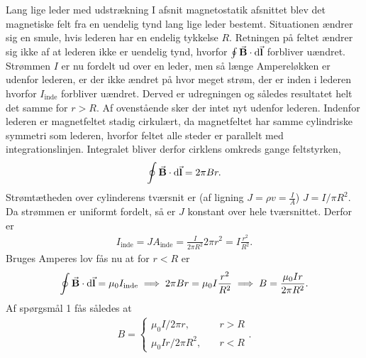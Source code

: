 \documentclass[crop=false, class=memoir]{standalone}
\begin{document}
\begin{opgave}{Lang lige leder med udstrækning}
    I afsnit magnetostatik afsnittet blev det magnetiske felt fra en uendelig tynd lang lige leder bestemt. Situationen ændrer sig en smule, hvis lederen har en endelig tykkelse $R$.
    \opg Retningen på feltet ændrer sig ikke af at lederen ikke er uendelig tynd, hvorfor $\oint \va B \cdot \dd \va l$ forbliver uændret. Strømmen $I$ er nu fordelt ud over en leder, men så længe Ampereløkken er udenfor lederen, er der ikke ændret på hvor meget strøm, der er inden i lederen hvorfor $I_\mathrm{inde}$ forbliver uændret. Derved er udregningen og således resultatet helt det samme for $r>R$.
    \opg Af ovenstående sker der intet nyt udenfor lederen. Indenfor lederen er magnetfeltet stadig cirkulært, da magnetfeltet har samme cylindriske symmetri som lederen, hvorfor feltet alle steder er parallelt med integrationslinjen. Integralet bliver derfor cirklens omkreds gange feltstyrken,
    \begin{align}
        \oint \va B \cdot \dd \va l = 2\pi B r.
    \end{align}
    \opg Strømtætheden over cylinderens tværsnit er (af ligning $J=\rho v=\frac{I}{A}$) $J = I/\pi R^2$. Da strømmen er uniformt fordelt, så er $J$ konstant over hele tværsnittet. Derfor er
    \begin{align}
        I_\mathrm{inde} = JA_\mathrm{inde}= \frac{I}{2\pi R^2} 2\pi r^2 = I \frac{r^2}{R^2}.
    \end{align}
    \opg Bruges Amperes lov fås nu at for $r<R$ er
    \begin{align*}
        \oint \va B \cdot \dd \va l = \mu_0I_\mathrm{inde} \implies 2\pi B r = \mu_0I \frac{r^2}{R^2} \implies B = \frac{\mu_0Ir}{2\pi R^2}.
    \end{align*}
    Af spørgsmål 1 fås således at
    \begin{align*}
        B = \begin{cases}
            \mu_0I/2\pi r, \qquad &r>R \\
            \mu_0Ir/2\pi R^2, \quad &r<R
        \end{cases}
        .
    \end{align*}
    \begin{figure}
        \centering
        \begin{subfigure}[t]{.47\textwidth}
            \centering

\end{subfigure}
\end{figure}
\end{opgave}
\end{document}
